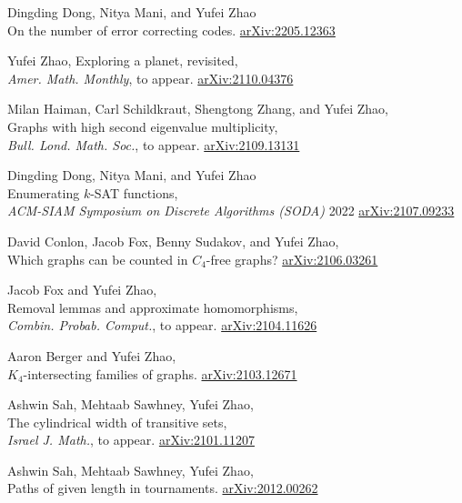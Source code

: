 \documentclass[11pt]{amsart}
\newcommand{\arXiv}[1]{\href{http://arxiv.org/abs/#1}{\color{black!50}\footnotesize\ttfamily  arXiv:#1}}
\renewcommand{\j}[1]{{\frenchspacing\itshape #1}}
\begin{document}
\begin{etaremune}[leftmargin=0.3in,itemsep=4pt,topsep=0pt,partopsep=0pt,parsep=0pt]

\item
Dingding Dong, Nitya Mani, and Yufei Zhao \\
On the number of error correcting codes. \arXiv{2205.12363}


\item Yufei Zhao, Exploring a planet, revisited, \\
  \j{Amer. Math. Monthly}, to appear. \arXiv{2110.04376}

\item
Milan Haiman, Carl Schildkraut, Shengtong Zhang, and Yufei Zhao, \\
Graphs with high second eigenvalue multiplicity, \\
\j{Bull. Lond. Math. Soc.}, to appear. 
\arXiv{2109.13131}

\item 
Dingding Dong, Nitya Mani, and Yufei Zhao \\
Enumerating $k$-SAT functions,	\\
\j{ACM-SIAM Symposium on Discrete Algorithms (SODA)} 2022
\arXiv{2107.09233}

\item David Conlon, Jacob Fox, Benny Sudakov, and Yufei Zhao, \\
	Which graphs can be counted in $C_4$-free graphs? \arXiv{2106.03261}

\item Jacob Fox and Yufei Zhao, \\
	Removal lemmas and approximate homomorphisms,
	\\
	\j{Combin. Probab. Comput.}, to appear.
	\arXiv{2104.11626}

\item Aaron Berger and Yufei Zhao, \\
	$K_4$-intersecting families of graphs. 
	\arXiv{2103.12671}

\item Ashwin Sah, Mehtaab Sawhney, Yufei Zhao, \\
	  The cylindrical width of transitive sets, \\
	  \j{Israel J. Math.}, to appear. \arXiv{2101.11207}

\item Ashwin Sah, Mehtaab Sawhney, Yufei Zhao, \\
	  Paths of given length in tournaments. 
	\arXiv{2012.00262}


\end{etaremune}
\end{document}
